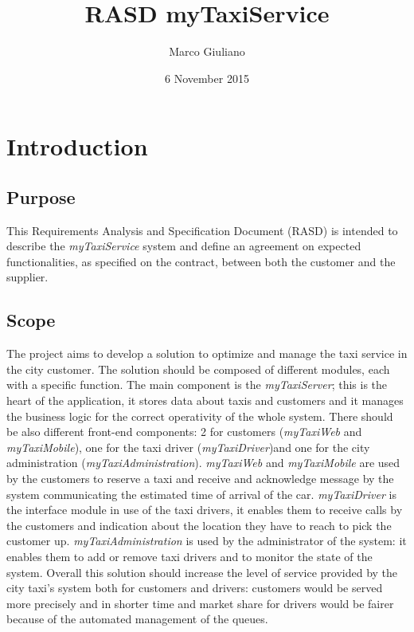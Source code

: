 \documentclass[12pt,a4paper]{book}
\begin{document}
	\title{RASD myTaxiService}
	\author{Marco Giuliano}
	\date{6 November 2015}
	\maketitle
	\tableofcontents
	\chapter{Introduction}
		\section{Purpose}
		This Requirements Analysis and Specification Document (RASD) is intended to describe the \textit{myTaxiService} system and define an agreement on expected functionalities, as specified on the contract, between both the customer and the supplier.
		\section{Scope}
		The project aims to develop a solution to optimize and manage the taxi service in the city customer.
		The solution should be composed of different modules, each with a specific function. The main component is the \textit{myTaxi\textunderscore Server}; this is the heart of the application, it stores data about taxis and customers and it manages the business logic for the correct operativity of the whole system.
		There should be also different front-end components: 2 for customers (\textit{myTaxi\textunderscore Web} and \textit{myTaxi\textunderscore Mobile}), one for the taxi driver (\textit{myTaxi\textunderscore Driver})and one for the city administration (\textit{myTaxi\textunderscore Administration}).
		\textit{myTaxi\textunderscore Web} and \textit{myTaxi\textunderscore Mobile} are used by the customers to reserve a taxi and receive and acknowledge message by the system communicating the estimated time of arrival of the car.
		\textit{myTaxi\textunderscore Driver} is the interface module in use of the taxi drivers, it enables them to receive calls by the customers and indication about the location they have to reach to pick the customer up.
		\textit{myTaxi\textunderscore Administration} is used by the administrator of the system: it enables them to add or remove taxi drivers and to monitor the state of the system.
		Overall this solution should increase the level of service provided by the city taxi's system both for customers and drivers: customers would be served more precisely and in shorter time and market share for drivers would be fairer because of the automated management of the queues.
\end{document}
